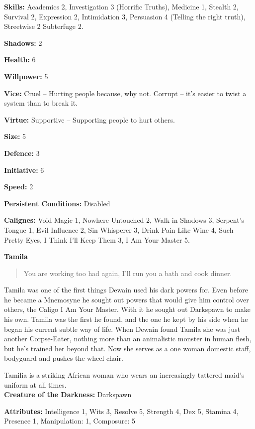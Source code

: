 \noindent \textbf{Skills:} Academics 2, Investigation 3 (Horrific Truths), Medicine 1, Stealth 2, Survival 2, Expression 2, Intimidation 3, Persuasion 4 (Telling the right truth), Streetwise 2 Subterfuge 2.

\noindent \textbf{Shadows:} 2

\noindent \textbf{Health:} 6

\noindent \textbf{Willpower:} 5

\noindent \textbf{Vice:} Cruel – Hurting people because, why not. Corrupt – it's easier to twist a system than to break it. 

\noindent \textbf{Virtue:} Supportive – Supporting people to hurt others.

\noindent \textbf{Size:} 5

\noindent \textbf{Defence:} 3

\noindent \textbf{Initiative:} 6

\noindent \textbf{Speed:} 2

\noindent \textbf{Persistent Conditions:} Disabled

\noindent \textbf{Calignes:} Void Magic 1, Nowhere Untouched 2, Walk in Shadows 3, Serpent's Tongue 1, Evil Influence 2, Sin Whisperer 3, Drink Pain Like Wine 4, Such Pretty Eyes, I Think I'll Keep Them 3, I Am Your Master 5.

\noindent \textbf{Tamila}

\begin{quote}You are working too had again, I'll run you a bath and cook dinner.\end{quote}

Tamila was one of the first things Dewain used his dark powers for. Even before he became a Mnemosyne he sought out powers that would give him control over others, the Caligo I Am Your Master. With it he sought out Darkspawn to make his own. Tamila was the first he found, and the one he kept by his side when he began his current subtle way of life. When Dewain found Tamila she was just another Corpse-Eater, nothing more than an animalistic monster in human flesh, but he's trained her beyond that. Now she serves as a one woman domestic staff, bodyguard and pushes the wheel chair.

Tamilia is a striking African woman who wears an increasingly tattered maid's uniform at all times.\\

\noindent \textbf{Creature of the Darkness:} Darkspawn

\noindent \textbf{Attributes:} Intelligence 1, Wits 3, Resolve 5, Strength 4, Dex 5, Stamina 4, Presence 1, Manipulation: 1, Composure: 5

